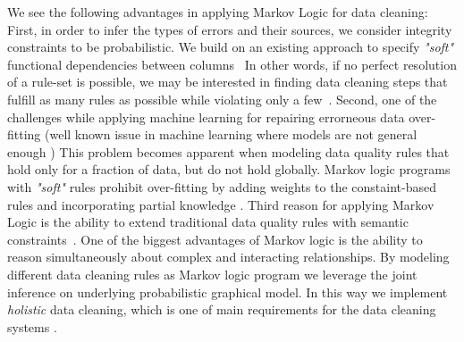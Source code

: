 We see the following advantages in applying Markov Logic for data cleaning: 
First, in order to infer the types of errors and their sources, we consider integrity constraints to be probabilistic. We build on an existing approach to specify \textit{"soft"} functional dependencies between columns~\cite{Ilyas:2004:CAD:1007568.1007641} %
In other words, if no perfect resolution of a rule-set is possible, we may be interested in finding data cleaning steps that fulfill as many rules as possible while violating only a few~\cite{genesereth1987logical, domingos2009markov}. 
Second, one of the challenges while applying machine learning for repairing errorneous data over-fitting (well known issue in machine learning where models are not general enough \cite{Domingos2012useful})%
This problem becomes apparent when modeling data quality rules that hold only for a fraction of data, but do not hold globally. Markov logic programs with \textit{"soft"} rules prohibit over-fitting by adding weights to the constaint-based rules and incorporating partial knowledge \cite{singla2006entity, poon2008joint, lowd2007recursive}. %
Third reason for applying Markov Logic is the ability to extend traditional data quality rules with semantic constraints~\cite{spies2013knowledge}.
One of the biggest advantages of Markov logic is the ability to reason simultaneously about complex and interacting relationships. By modeling different data cleaning rules as Markov logic program we leverage the joint inference on underlying probabilistic graphical model. In this way we implement \textit{holistic} data cleaning, which is one of main requirements for the data cleaning systems \cite{fan2013data, Fan:2014:IRM:2628135.2567657, Dallachiesa:2013:NCD:2463676.2465327}. 


